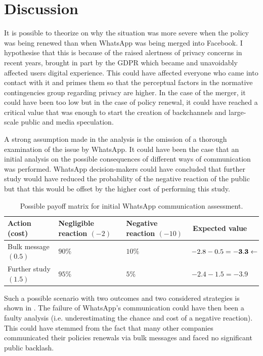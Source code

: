 \section{Discussion} \label{sec:discussion}

It is possible to theorize on why the situation was more severe when the policy was being renewed than when WhatsApp was being merged into Facebook.
I hypothesise that this is because of the raised alertness of privacy concerns in recent years, brought in part by the GDPR which became and unavoidably affected users digital experience.
This could have affected everyone who came into contact with it and primes them so that the perceptual factors in the normative contingencies group regarding privacy are higher.
In the case of the merger, it could have been too low but in the case of policy renewal, it could have reached a critical value that was enough to start the creation of backchannels and large-scale public and media speculation.

A strong assumption made in the analysis is the omission of a thorough examination of the issue by WhatsApp.
It could have been the case that an initial analysis on the possible consequences of different ways of communication was performed.
WhatsApp decision-makers could have concluded that further study would have reduced the probability of the negative reaction of the public but that this would be offset by the higher cost of performing this study.

\begin{table}[ht]
\centering
\begin{tabular}{l>{\centering\arraybackslash}p{2.35cm}>{\centering\arraybackslash}p{2.55cm}cr}
\toprule
Action (cost) & Negligible reaction $(-2)$ & Negative reaction $(-10)$ & Expected value \\
\midrule
Bulk message $(0.5)$  & $90\%$ & $10\%$ & $-2.8-0.5=\mathbf{-3.3}\leftarrow\hspace{-0.5cm}$\\
Further study $(1.5)$ & $95\%$ & $5\%$ & $-2.4-1.5=\mathbf{-3.9}$\\
\bottomrule
\end{tabular}
\caption{Possible payoff matrix for initial WhatsApp communication assessment.}
\label{tab:payoff}
\end{table}

Such a possible scenario with two outcomes and two considered strategies is shown in .
The failure of WhatsApp's communication could have then been a faulty analysis (i.e. underestimating the chance and cost of a negative reaction).
This could have stemmed from the fact that many other companies communicated their policies renewals via bulk messages and faced no significant public backlash.

